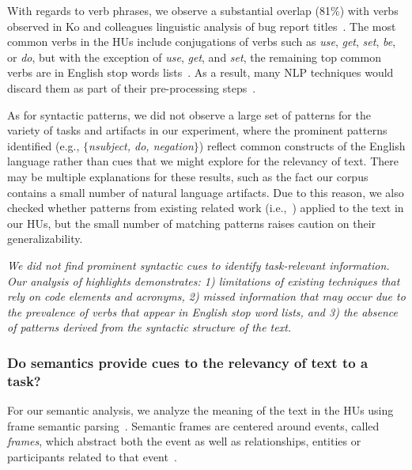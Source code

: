 With regards to verb phrases, we observe a substantial
overlap (81\%) with verbs observed in Ko and colleagues linguistic analysis
of bug report titles~\cite{Ko2006}.
The most common verbs in the HUs include conjugations of verbs such as \textit{use}, \textit{get}, \textit{set}, \textit{be}, or \textit{do},
but with the exception of \textit{use}, \textit{get}, and \textit{set}, the
remaining top common verbs are in English stop words lists~\cite{jurafsky2014speech}. As a result, many
\acs{NLP} techniques would discard them as part of their pre-processing
steps~\cite{Bavota2016}.






As for syntactic patterns, we did not observe a large set of patterns for the variety of tasks and artifacts in our experiment,
where the prominent patterns identified (e.g., $\{$\textit{nsubject, do, negation}$\}$)
reflect common constructs of the English language rather than cues that we might explore for the relevancy of text.
There may be multiple explanations for these results, such as
the fact our corpus contains a small number of natural language artifacts.
Due to this reason, we also checked whether patterns from existing related work (i.e.,~\cite{Chaparro2017, Robillard2015}) applied to the text in our HUs, 
but the small number of matching patterns 
raises caution on
their generalizability.



\medskip
\begin{bluequote}
    \textit{We did not find prominent syntactic cues to identify
    task-relevant information. Our analysis of highlights demonstrates:
    1) limitations of existing techniques that rely on code
    elements and acronyms, 2) missed
    information that may occur due to the prevalence of verbs that
    appear in English stop word lists,
    and 3) the absence of patterns derived from the syntactic structure of
    the text.}
\end{bluequote}

 



\subsubsection{Do semantics provide cues to the relevancy of text to a task?}
\label{cp3:semantic-analysis}


For our semantic analysis, we
analyze the meaning of the text in the 
 HUs
using frame semantic parsing~\cite{fillmore1976frame, jurafsky2014speech}.
Semantic frames are centered around events, called \textit{frames}, 
which abstract both the event
as well as relationships, entities or participants related to that
event~\cite{fillmore1976frame, Baker1998frame}. 


